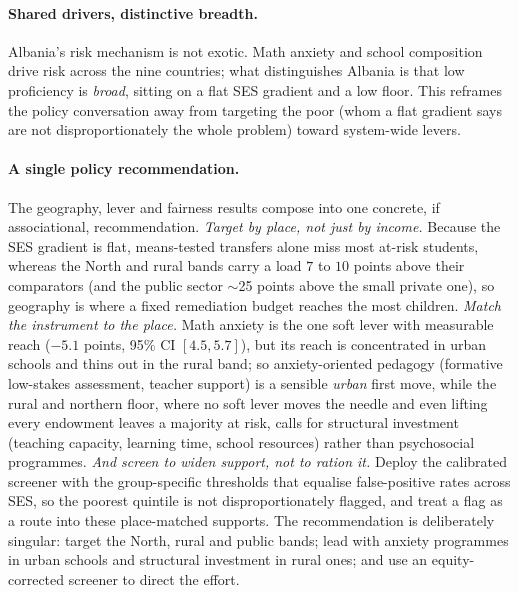 \paragraph{Shared drivers, distinctive breadth.}
Albania's risk mechanism is not exotic. Math anxiety and school composition drive risk
across the nine countries; what distinguishes Albania is that low proficiency is
\emph{broad}, sitting on a flat SES gradient and a low floor. This reframes the policy
conversation away from targeting the poor (whom a flat gradient says are not
disproportionately the whole problem) toward system-wide levers.

\paragraph{A single policy recommendation.}
The geography, lever and fairness results compose into one concrete, if
associational, recommendation. \emph{Target by place, not just by income.} Because the
SES gradient is flat, means-tested transfers alone miss most at-risk students, whereas the
North and rural bands carry a load $7$ to $10$ points above their comparators (and the
public sector $\sim$25 points above the small private one), so geography is where a fixed
remediation budget reaches the most children. \emph{Match the instrument to the place.}
Math anxiety is the one soft lever with measurable reach ($-5.1$ points, 95\% CI
$[4.5,5.7]$), but its reach is concentrated in urban schools and thins out in the rural
band; so anxiety-oriented pedagogy (formative low-stakes assessment, teacher support) is a
sensible \emph{urban} first move, while the rural and northern floor, where no soft lever
moves the needle and even lifting every endowment leaves a majority at risk, calls for
structural investment (teaching capacity, learning time, school resources) rather than
psychosocial programmes. \emph{And screen to widen support, not to ration it.} Deploy the
calibrated screener with the group-specific thresholds that equalise false-positive rates
across SES, so the poorest quintile is not disproportionately flagged, and treat a flag as
a route into these place-matched supports. The recommendation is deliberately singular:
target the North, rural and public bands; lead with anxiety programmes in urban schools
and structural investment in rural ones; and use an equity-corrected screener to direct
the effort.

